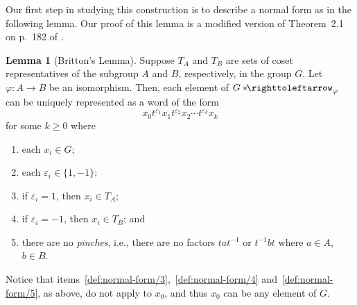 \documentclass[11pt,a4paper,reqno]{amsart}
\theoremstyle{plain}
\theoremstyle{definition}
\newtheorem{lemma}[theorem]{Lemma}
\theoremstyle{definition}
\renewcommand\geq\geqslant
\newcommand\hnn{*\!\!\righttoleftarrow}
\begin{document}
Our first step in studying this construction is to describe a normal form as in the following lemma.
Our proof of this lemma is a modified version of Theorem~2.1 on p.~182 of \cite{lyndon2001}.

\begin{lemma}[Britton's Lemma]\label{def:normal-form}
	Suppose $T_A$ and $T_B$ are sets of coset representatives of the subgroup $A$ and $B$, respectively, in the group $G$.
	Let $\varphi\colon A\to B$ be an isomorphism.
	Then, each element of $G\hnn_\varphi$ can be uniquely represented as a word of the form
	\begin{equation}\label{eq:normal-form}
		x_0 t^{\varepsilon_1} x_1 t^{\varepsilon_2} x_2 \cdots t^{\varepsilon_k} x_k
	\end{equation}
	for some $k\geq 0$ where
	\begin{enumerate}
		\item\label{def:normal-form/1} each $x_i \in G$;
		\item\label{def:normal-form/2} each $\varepsilon_i \in \{1,-1\}$;
		\item\label{def:normal-form/3} if $\varepsilon_i = 1$, then $x_i \in T_A$;
		\item\label{def:normal-form/4} if $\varepsilon_i = -1$, then $x_i \in T_B$; and
		\item\label{def:normal-form/5} there are no \emph{pinches}, i.e., there are no factors $tat^{-1}$ or $t^{-1}bt$ where $a\in A$, $b\in B$.
	\end{enumerate}
	Notice that items~\ref{def:normal-form/3},~\ref{def:normal-form/4} and~\ref{def:normal-form/5}, as above, do not apply to $x_0$, and thus $x_0$ can be any element of $G$.
\end{lemma}
\end{document}
